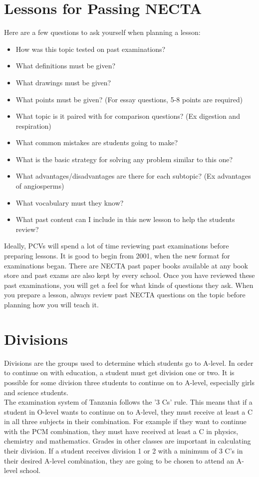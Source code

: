 \section{Lessons for Passing NECTA}
Here are a few questions to ask yourself when planning a lesson:
\begin{itemize}
\item How was this topic tested on past examinations?
\item What definitions must be given?
\item What drawings must be given?
\item What points must be given? (For essay questions, 5-8 points are required)
\item What topic is it paired with for comparison questions? (Ex digestion and respiration)
\item What common mistakes are students going to make?
\item What is the basic strategy for solving any problem similar to this one?
\item What advantages/disadvantages are there for each subtopic? (Ex advantages of angiosperms)
\item What vocabulary must they know?
\item What past content can I include in this new lesson to help the students review?
\end{itemize}

      Ideally, PCVs will spend a lot of time reviewing past examinations before preparing lessons.  It is good to begin from 2001, when the new format for examinations began.  There are NECTA past paper books available at any book store and past exams are also kept by every school.  Once you have reviewed these past examinations, you will get a feel for what kinds of questions they ask.  When you prepare a lesson, always review past NECTA questions on the topic before planning how you will teach it. \\

\section{Divisions} 
      Divisions are the groups used to determine which students go to A-level.  In order to continue on with education, a student must get division one or two.  It is possible for some division three students to continue on to A-level, especially girls and science students.\\   
      The examination system of Tanzania follows the '3 Cs' rule.  This means that if a student in O-level wants to continue on to A-level, they must receive at least a C in all three subjects in their combination.  For example if they want to continue with the PCM combination, they must have received at least a C in physics, chemistry and mathematics.  Grades in other classes are important in calculating their division.  If a student receives division 1 or 2 with a minimum of 3 C's in their desired A-level combination, they are going to be chosen to attend an A-level school. \\

